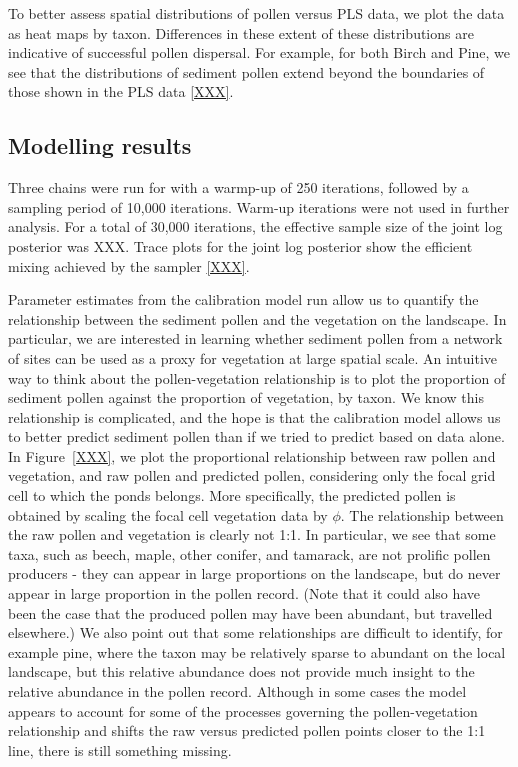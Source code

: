 \documentclass[12pt]{article}
\begin{document}
To better assess spatial distributions of pollen versus PLS data, we plot the data as heat maps by taxon. Differences in these extent of these distributions are indicative of successful pollen dispersal. For example, for both Birch and Pine, we see that the distributions of sediment pollen extend beyond the boundaries of those shown in the PLS data \ref{XXX}.

\subsection{Modelling results}

Three chains were run for with a warmp-up of 250 iterations, followed
by a sampling period of 10,000 iterations. Warm-up iterations were not
used in further analysis. For a total of 30,000 iterations, the
effective sample size of the joint log posterior was XXX. Trace plots
for the joint log posterior show the efficient mixing achieved by the
sampler \ref{XXX}.

Parameter estimates from the calibration model run allow us to
quantify the relationship between the sediment pollen and the
vegetation on the landscape. In particular, we are interested in
learning whether sediment pollen from a network of sites can be used
as a proxy for vegetation at large spatial scale. An intuitive way to
think about the pollen-vegetation relationship is to plot the
proportion of sediment pollen against the proportion of vegetation, by
taxon. We know this relationship is complicated, and the hope is that
the calibration model allows us to better predict sediment pollen than
if we tried to predict based on data alone. In Figure~\ref{XXX}, we
plot the proportional relationship between raw pollen and vegetation,
and raw pollen and predicted pollen, considering only the focal grid
cell to which the ponds belongs. More specifically, the predicted
pollen is obtained by scaling the focal cell vegetation data by
$\phi$. The relationship between the raw pollen and vegetation is
clearly not 1:1. In particular, we see that some taxa, such as beech,
maple, other conifer, and tamarack, are not prolific pollen producers
- they can appear in large proportions on the landscape, but do never
appear in large proportion in the pollen record. (Note that it could
also have been the case that the produced pollen may have been
abundant, but travelled elsewhere.) We also point out that some
relationships are difficult to identify, for example pine, where the
taxon may be relatively sparse to abundant on the local landscape, but
this relative abundance does not provide much insight to the relative
abundance in the pollen record. Although in some cases the model
appears to account for some of the processes governing the
pollen-vegetation relationship and shifts the raw versus predicted
pollen points closer to the 1:1 line, there is still something
missing.
\end{document}
